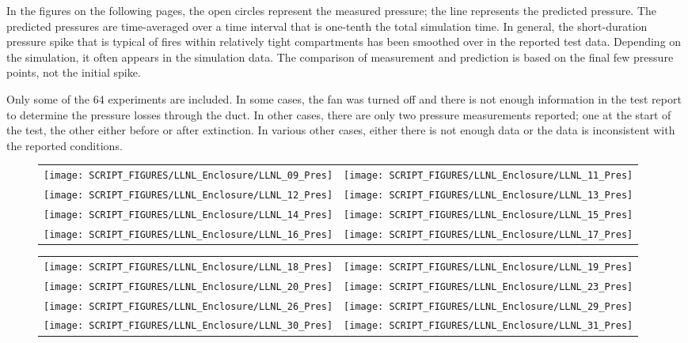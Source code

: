 In the figures on the following pages, the open circles represent the measured pressure; the line represents the predicted pressure. The predicted pressures are time-averaged over a time interval that is one-tenth the total simulation time. In general, the short-duration pressure spike that is typical of fires within relatively tight compartments has been smoothed over in the reported test data. Depending on the simulation, it often appears in the simulation data. The comparison of measurement and prediction is based on the final few pressure points, not the initial spike.

Only some of the 64 experiments are included. In some cases, the fan was turned off and there is not enough information in the test report to determine the pressure losses through the duct. In other cases, there are only two pressure measurements reported; one at the start of the test, the other either before or after extinction. In various other cases, either there is not enough data or the data is inconsistent with the reported conditions.

\begin{figure}[p]
\begin{tabular*}{\textwidth}{l@{\extracolsep{\fill}}r}
\texttt{[image: SCRIPT\_FIGURES/LLNL\_Enclosure/LLNL\_09\_Pres]} &
\texttt{[image: SCRIPT\_FIGURES/LLNL\_Enclosure/LLNL\_11\_Pres]} \\
\texttt{[image: SCRIPT\_FIGURES/LLNL\_Enclosure/LLNL\_12\_Pres]} &
\texttt{[image: SCRIPT\_FIGURES/LLNL\_Enclosure/LLNL\_13\_Pres]} \\
\texttt{[image: SCRIPT\_FIGURES/LLNL\_Enclosure/LLNL\_14\_Pres]} &
\texttt{[image: SCRIPT\_FIGURES/LLNL\_Enclosure/LLNL\_15\_Pres]} \\
\texttt{[image: SCRIPT\_FIGURES/LLNL\_Enclosure/LLNL\_16\_Pres]} &
\texttt{[image: SCRIPT\_FIGURES/LLNL\_Enclosure/LLNL\_17\_Pres]}
\end{tabular*}
\label{LLNL_Enclosure_Pres_2}
\end{figure}

\begin{figure}[p]
\begin{tabular*}{\textwidth}{l@{\extracolsep{\fill}}r}
\texttt{[image: SCRIPT\_FIGURES/LLNL\_Enclosure/LLNL\_18\_Pres]} &
\texttt{[image: SCRIPT\_FIGURES/LLNL\_Enclosure/LLNL\_19\_Pres]} \\
\texttt{[image: SCRIPT\_FIGURES/LLNL\_Enclosure/LLNL\_20\_Pres]} &
\texttt{[image: SCRIPT\_FIGURES/LLNL\_Enclosure/LLNL\_23\_Pres]} \\
\texttt{[image: SCRIPT\_FIGURES/LLNL\_Enclosure/LLNL\_26\_Pres]} &
\texttt{[image: SCRIPT\_FIGURES/LLNL\_Enclosure/LLNL\_29\_Pres]} \\
\texttt{[image: SCRIPT\_FIGURES/LLNL\_Enclosure/LLNL\_30\_Pres]} &
\texttt{[image: SCRIPT\_FIGURES/LLNL\_Enclosure/LLNL\_31\_Pres]}
\end{tabular*}
\label{LLNL_Enclosure_Pres_3}
\end{figure}

